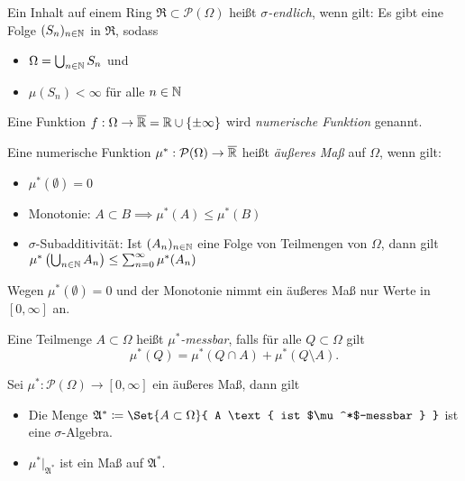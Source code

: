 \documentclass{cheat-sheet}
\newcommand{\PS}{\mathcal{P}} %
\newcommand{\PSO}{\PS(\Omega)} %
\newcommand{\Alg}{\mathfrak{A}}
\newcommand{\Ring}{\mathfrak{R}}
\begin{document}
\begin{defn}
  Ein Inhalt auf einem Ring $\Ring \subset \PSO$ heißt \emph{$\sigma$-endlich}, wenn gilt: Es gibt eine Folge $(S_n)_{n \in \mathbb{N}}$ in $\Ring$, sodass
  \begin{itemize}
    \item $\Omega = \bigcup_{n \in \mathbb{N}} S_n$ und
    \item $\mu(S_n) < \infty$ für alle $n \in \mathbb{N}$
  \end{itemize}
\end{defn}

\begin{defn}
  Eine Funktion $f : \Omega \to \overline{\mathbb{R}} = \mathbb{R} \cup \{ \pm \infty \}$ wird \emph{numerische Funktion} genannt.
\end{defn}

\begin{defn}
  Eine numerische Funktion $\mu^* : \PSO \to \overline{\R}$ heißt \emph{äußeres Maß} auf $\Omega$, wenn gilt:
  \begin{itemize}
    \item $\mu^*(\emptyset) = 0$
    \item Monotonie: $A \subset B \implies \mu^*(A) \leq \mu^*(B)$
    \item $\sigma$-Subadditivität: Ist $(A_n)_{n \in \mathbb{N}}$ eine Folge von Teilmengen von $\Omega$, dann gilt $\mu^*\left(\bigcup_{n \in \mathbb{N}} A_n \right) \leq \sum_{n = 0}^\infty \mu^*(A_n)$
  \end{itemize}
\end{defn}

\begin{bem}
  Wegen $\mu^*(\emptyset) = 0$ und der Monotonie nimmt ein äußeres Maß nur Werte in $[0, \infty]$ an.
\end{bem}

\begin{defn}
  Eine Teilmenge $A \subset \Omega$ heißt \emph{$\mu^*$-messbar}, falls für alle $Q \subset \Omega$ gilt
  \[ \mu^*(Q) = \mu^*(Q \cap A) + \mu^*(Q \setminus A). \]
\end{defn}

\begin{satz}[Carathéodory]
  Sei $\mu^* : \PSO \to [0, \infty]$ ein äußeres Maß, dann gilt
  \begin{itemize}
    \item Die Menge $\Alg^* \coloneqq \Set{ A \subset \Omega }{ A \text{ ist $\mu^*$-messbar } }$ ist eine $\sigma$-Algebra.
    \item $\mu^*|_{\Alg^*}$ ist ein Maß auf $\Alg^*$.
  \end{itemize}
\end{satz}
\end{document}
